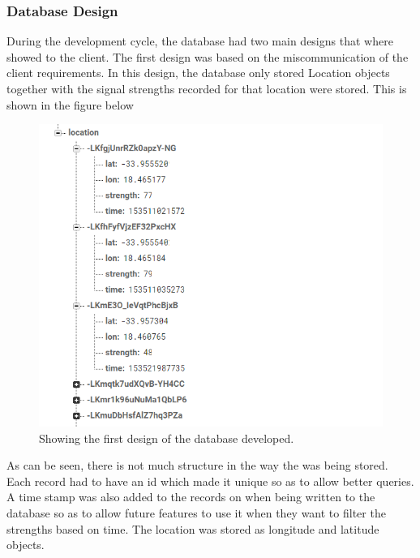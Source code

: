\subsubsection*{Database Design}
 During the development cycle, the database had two main designs that where showed to the client. The first design was based on the miscommunication of the client requirements. In this design, the database only stored Location objects together with the signal strengths recorded for that location were stored. This is shown in the figure below
 \begin{figure}
 	\centering
 	\includegraphics[width=0.7\linewidth]{images/first_db}
 	\caption{Showing the first design of the database developed.}
 	\label{fig:firstdb}
 \end{figure}
As can be seen, there is not much structure in the way the was being stored. Each record had to have an id which made it unique so as to allow better queries. A time stamp was also added to the records on when being written to the database so as to allow future features to use it when they want to filter the strengths based on time. The location was stored as longitude and latitude objects.
